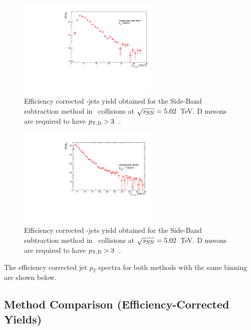 \begin{figure}[bth]
\centering
\includegraphics[width=0.6\textwidth]{pPbplots/plotsSB_pt3_noDetails/jetPtSpectrum_SB_FASTwoSDD_pTD3}
\caption{Efficiency corrected \Dstar-jets yield obtained for the Side-Band subtraction method in \pPb\ collisions at $\sqrt{s_{\rm NN}}=5.02$~TeV. D mesons are required to have $p_{\mathrm{T,D}}>3$~\GeVc.}
\label{fig:eq_pPb_Directjet_corrSum_Dstar}
\end{figure}

\begin{figure}[bth]
\centering
\includegraphics[width=0.6\textwidth]{pPbplotsD0/Default/signalExtraction/plots/jetPtSpectrum_SB_LHC16R03_pTD3.pdf}
\caption{Efficiency corrected \Dzero-jets yield obtained for the Side-Band subtraction method in \pPb\ collisions at $\sqrt{s_{\rm NN}}=5.02$~TeV. D mesons are required to have $p_{\mathrm{T,D}}>3$~\GeVc.}
\label{fig:eq_pPb_Directjet_corrSum_Dzero}
\end{figure}
%
The efficiency corrected jet $p_{T}$ spectra for both methods with the same binning are shown below.

\subsection{Method Comparison (Efficiency-Corrected Yields)}

